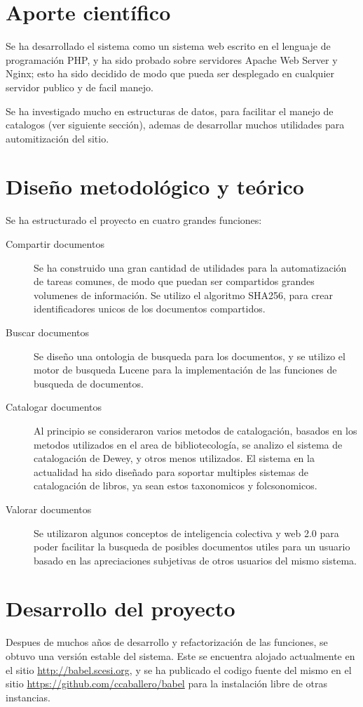 \documentclass[letter,11pt,oneside,spanish]{article}
\begin{document}
\section{Aporte científico}
Se ha desarrollado el sistema como un sistema web escrito en el lenguaje de programación PHP, y ha 
sido probado sobre servidores Apache Web Server y Nginx; esto ha sido decidido de modo que pueda
ser desplegado en cualquier servidor publico y de facil manejo.

Se ha investigado mucho en estructuras de datos, para facilitar el manejo de catalogos (ver siguiente
sección), ademas de desarrollar muchos utilidades para automitización del sitio.

\section{Diseño metodológico y teórico}
Se ha estructurado el proyecto en cuatro grandes funciones:

\begin{description}
\item [Compartir documentos]
    Se ha construido una gran cantidad de utilidades para la automatización de tareas comunes,
    de modo que puedan ser compartidos grandes volumenes de información.
    Se utilizo el algoritmo SHA256, para crear identificadores unicos de los documentos compartidos.
\item [Buscar documentos]
    Se diseño una ontologia de busqueda para los documentos, y se utilizo el motor de busqueda Lucene
    para la implementación de las funciones de busqueda de documentos.
\item [Catalogar documentos]
    Al principio se consideraron varios metodos de catalogación, basados en los metodos utilizados en
    el area de bibliotecología, se analizo el sistema de catalogación de Dewey, y otros menos
    utilizados.
    El sistema en la actualidad ha sido diseñado para soportar multiples sistemas de catalogación de
    libros, ya sean estos taxonomicos y folcsonomicos.
\item [Valorar documentos]
    Se utilizaron algunos conceptos de inteligencia colectiva y web 2.0 para poder facilitar la
    busqueda de posibles documentos utiles para un usuario basado en las apreciaciones subjetivas
    de otros usuarios del mismo sistema.
\end{description}

\section{Desarrollo del proyecto}
Despues de muchos años de desarrollo y refactorización de las funciones, se obtuvo una versión
estable del sistema. Este se encuentra alojado actualmente en el sitio \url{http://babel.scesi.org},
y se ha publicado el codigo fuente del mismo en el sitio \url{https://github.com/ccaballero/babel}
para la instalación libre de otras instancias.
\end{document}
